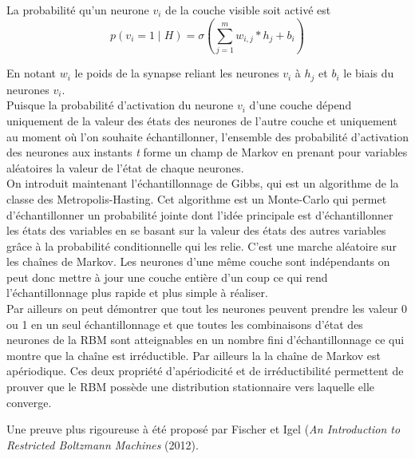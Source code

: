 \documentclass[a4paper,oneside]{report}
\begin{document}
                La probabilité qu'un neurone \begin{math}v_{i}\end{math} de la
                couche visible soit activé est \begin{equation}p( v_{i} =1 \mid H) = 
\sigma(\sum_{j=1}^{m} w_{i,j} * h_{j} + b_{i}) \end{equation}

				En notant \textit{$w_{i}$} le poids de la synapse reliant les neurones \textit{$v_{i}$} 
à \textit{$h_{j}$} et \textit{$b_{i}$} le biais du neurones \textit{$v_{i}$}.\\
        
					Puisque la probabilité  d'activation du neurone \textit{$v_{i}$} d'une couche dépend 
uniquement de la valeur des états des neurones de l'autre couche et uniquement au 
moment où l'on souhaite 
échantillonner, l'ensemble des probabilité d'activation des neurones aux instants \textit{t} forme 
un champ de Markov en prenant pour variables aléatoires la valeur de l'état de chaque neurones.\\


                On introduit maintenant l'échantillonnage de Gibbs, qui est un
                algorithme de la classe des Metropolis-Hasting. Cet algorithme
               est un Monte-Carlo qui permet d'échantillonner un probabilité jointe dont l'idée principale
                est d'échantillonner les états des variables en se basant sur la valeur des états
                des autres variables grâce à la probabilité conditionnelle qui les relie. C'est une marche aléatoire sur les chaînes de Markov.
Les neurones d'une même couche sont indépendants on peut donc mettre à jour une couche 
entière d'un coup ce qui rend l'échantillonnage plus rapide et plus simple à réaliser. \\

           Par ailleurs on peut démontrer que tout les neurones peuvent prendre les valeur 0 ou 1
 en un seul échantillonnage et que toutes les combinaisons d'état des neurones de la RBM 
sont atteignables en un nombre fini d'échantillonnage ce qui montre que la chaîne est irréductible. Par ailleurs la la chaîne de Markov est apériodique. 
Ces deux propriété d'apériodicité et de irréductibilité permettent de prouver que le RBM
 possède une distribution stationnaire vers laquelle elle converge. 

               Une preuve plus rigoureuse à été proposé par Fischer et Igel (\textit{An Introduction to Restricted Boltzmann Machines} (2012).\\
\end{document}
